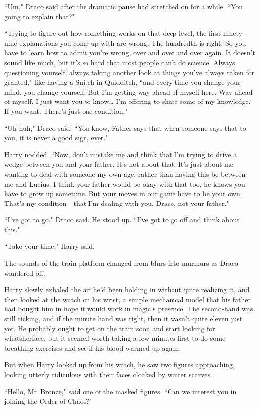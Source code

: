 ``Um," Draco said after the dramatic pause had stretched on for a while. ``You going to explain that?"

``Trying to figure out how something works on that deep level, the first ninety-nine explanations you come up with are wrong. The hundredth is right. So you have to learn how to admit you're wrong, over and over and over again. It doesn't sound like much, but it's so hard that most people can't do science. Always questioning yourself, always taking another look at things you've always taken for granted," like having a Snitch in Quidditch, ``and every time you change your mind, you change yourself. But I'm getting way ahead of myself here. Way ahead of myself. I just want you to know{\ldots} I'm offering to share some of my knowledge. If you want. There's just one condition."

``Uh huh," Draco said. ``You know, Father says that when someone says that to you, it is never a good sign, ever."

Harry nodded. ``Now, don't mistake me and think that I'm trying to drive a wedge between you and your father. It's not about that. It's just about me wanting to deal with someone my own age, rather than having this be between me and Lucius. I think your father would be okay with that too, he knows you have to grow up sometime. But your moves in our game have to be your own. That's my condition—that I'm dealing with you, Draco, not your father."

``I've got to go," Draco said. He stood up. ``I've got to go off and think about this."

``Take your time," Harry said.

The sounds of the train platform changed from blurs into murmurs as Draco wandered off.

Harry slowly exhaled the air he'd been holding in without quite realizing it, and then looked at the watch on his wrist, a simple mechanical model that his father had bought him in hope it would work in magic's presence. The second-hand was still ticking, and if the minute hand was right, then it wasn't quite eleven just yet. He probably ought to get on the train soon and start looking for whatsherface, but it seemed worth taking a few minutes first to do some breathing exercises and see if his blood warmed up again.

But when Harry looked up from his watch, he saw two figures approaching, looking utterly ridiculous with their faces cloaked by winter scarves.

``Hello, Mr~Bronze," said one of the masked figures. ``Can we interest you in joining the Order of Chaos?"

